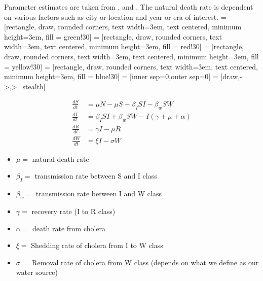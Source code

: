 \documentclass[12pt]{article}\usepackage[]{graphicx}\usepackage[]{color}
\begin{document}
Parameter estimates are taken from \cite{link5}, \cite{link8} and \cite{link3}.
The natural death rate is dependent on various factors such as city or location and year or era of interest.
 = [rectangle, draw, rounded corners, text width=3em, text centered, minimum height=3em, fill = green!30]
 = [rectangle, draw, rounded corners, text width=3em, text centered, minimum height=3em, fill = red!30]
 = [rectangle, draw, rounded corners, text width=3em, text centered, minimum height=3em, fill = yellow!30]
 = [rectangle, draw, rounded corners, text width=3em, text centered, minimum height=3em, fill = blue!30]
 = [inner sep=0,outer sep=0]
 = [draw,->,>=stealth]
\begin{center}
\end{center}
\begin{align*}
    \frac{dS}{dt}&= \mu N - \mu S - \beta_I SI - \beta_w S W  \\
    \frac{dI}{dt}&= \beta_I S I + \beta_w S W - I (\gamma + \mu + \alpha) \\
    \frac{dR}{dt}&= \gamma I - \mu R \\
    \frac{dW}{dt}&= \xi I  - \sigma W
\end{align*}
\begin{itemize}
    \item$\mu=$ natural death rate
    \item$\beta_I=$ transmission rate between S and I class
    \item$\beta_w=$ transmission rate between I and W class
    \item$\gamma=$ recovery rate (I to R class)
    \item$\alpha=$ death rate from cholera
    \item$\xi=$ Shedding rate of cholera from I to W class
    \item$\sigma=$	Removal rate of cholera from W class (depends on what we define as our water source)
\end{itemize}
\end{document}
